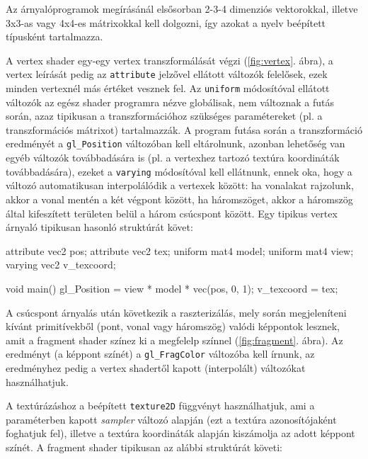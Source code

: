 Az árnyalóprogramok megírásánál elsősorban 2-3-4 dimenziós vektorokkal, illetve
3x3-as vagy 4x4-es mátrixokkal kell dolgozni, így azokat a nyelv beépített
típusként tartalmazza.


A vertex shader egy-egy vertex transzformálását végzi (\ref{fig:vertex}. ábra), a
vertex leírását pedig az \texttt{attribute} jelzővel ellátott változók
felelősek, ezek minden vertexnél más értéket vesznek fel. Az \texttt{uniform}
módosítóval ellátott változók az egész shader programra nézve globálisak, nem
változnak a futás során, azaz tipikusan a transzformációhoz szükséges
paramétereket (pl. a transzformációs mátrixot) tartalmazzák. A program futása
során a transzformáció eredményét a \texttt{gl\_Position} változóban kell
eltárolnunk, azonban lehetőség van egyéb változók továbbadására is (pl. a
vertexhez tartozó textúra koordináták továbbadására), ezeket a \texttt{varying}
módosítóval kell ellátnunk, ennek oka, hogy a változó automatikusan
interpolálódik a vertexek között: ha vonalakat rajzolunk, akkor a vonal mentén a
két végpont között, ha háromszöget, akkor a háromszög által kifeszített
területen belül a három csúcspont között. Egy tipikus vertex árnyaló tipikusan
hasonló struktúrát követ:

\begin{glsl}
  attribute vec2 pos;
  attribute vec2 tex;
  uniform mat4 model;
  uniform mat4 view;
  varying vec2 v_texcoord;

  void main() {
    gl_Position = view * model * vec(pos, 0, 1);
    v_texcoord = tex;
  }
\end{glsl}


A csúcspont árnyalás után következik a raszterizálás, mely során megjeleníteni
kívánt primitívekből (pont, vonal vagy háromszög) valódi képpontok lesznek, amit
a fragment shader színez ki a megfelelp színnel (\ref{fig:fragment}. ábra). Az
eredményt (a képpont színét) a \texttt{gl\_FragColor} változóba kell írnunk, az
eredményhez pedig a vertex shadertől kapott (interpolált) változókat
használhatjuk.

A textúrázáshoz a beépített \texttt{texture2D} függvényt használhatjuk, ami a
paraméterben kapott \emph{sampler} változó alapján (ezt a textúra
azonosítójaként foghatjuk fel), illetve a textúra koordináták alapján kiszámolja
az adott képpont színét. A fragment shader tipikusan az alábbi struktúrát
követi:

